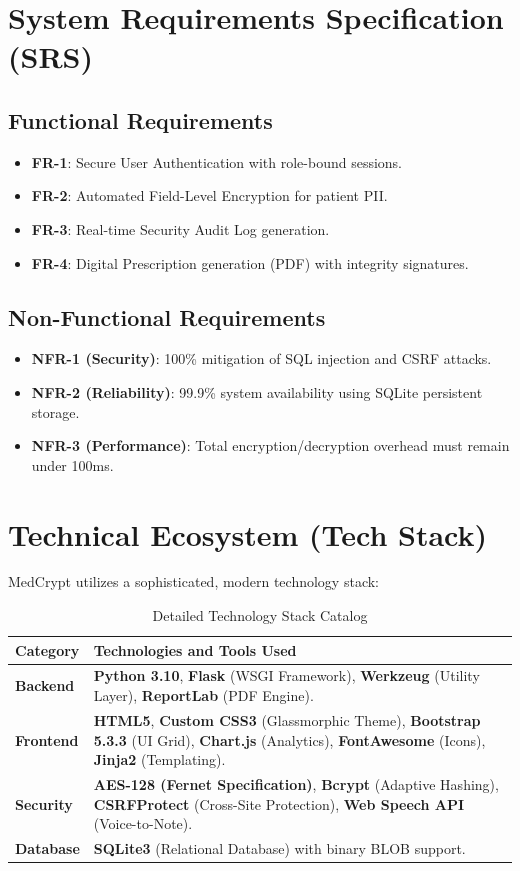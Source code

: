 \documentclass[conference,onecolumn]{IEEEtran}
\begin{document}
\section{System Requirements Specification (SRS)}
\subsection{Functional Requirements}
\begin{itemize}
    \item \textbf{FR-1}: Secure User Authentication with role-bound sessions.
    \item \textbf{FR-2}: Automated Field-Level Encryption for patient PII.
    \item \textbf{FR-3}: Real-time Security Audit Log generation.
    \item \textbf{FR-4}: Digital Prescription generation (PDF) with integrity signatures.
\end{itemize}

\subsection{Non-Functional Requirements}
\begin{itemize}
    \item \textbf{NFR-1 (Security)}: 100\% mitigation of SQL injection and CSRF attacks.
    \item \textbf{NFR-2 (Reliability)}: 99.9\% system availability using SQLite persistent storage.
    \item \textbf{NFR-3 (Performance)}: Total encryption/decryption overhead must remain under 100ms.
\end{itemize}

\section{Technical Ecosystem (Tech Stack)}
MedCrypt utilizes a sophisticated, modern technology stack:
\begin{table}[h]
\centering
\caption{Detailed Technology Stack Catalog}
\begin{tabular}{lp{12cm}}
\toprule
\textbf{Category} & \textbf{Technologies and Tools Used} \\
\midrule
\textbf{Backend} & \textbf{Python 3.10}, \textbf{Flask} (WSGI Framework), \textbf{Werkzeug} (Utility Layer), \textbf{ReportLab} (PDF Engine). \\
\textbf{Frontend} & \textbf{HTML5}, \textbf{Custom CSS3} (Glassmorphic Theme), \textbf{Bootstrap 5.3.3} (UI Grid), \textbf{Chart.js} (Analytics), \textbf{FontAwesome} (Icons), \textbf{Jinja2} (Templating). \\
\textbf{Security} & \textbf{AES-128 (Fernet Specification)}, \textbf{Bcrypt} (Adaptive Hashing), \textbf{CSRFProtect} (Cross-Site Protection), \textbf{Web Speech API} (Voice-to-Note). \\
\textbf{Database} & \textbf{SQLite3} (Relational Database) with binary BLOB support. \\
\bottomrule
\end{tabular}
\end{table}
\end{document}
